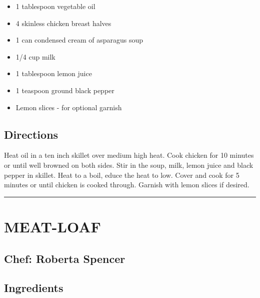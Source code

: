 \documentclass[
]{book}
\providecommand{\tightlist}{%
  \setlength{\itemsep}{0pt}\setlength{\parskip}{0pt}}
\begin{document}
\begin{itemize}
\tightlist
\item
  1 tablespoon vegetable oil
\item
  4 skinless chicken breast halves
\item
  1 can condensed cream of asparagus soup
\item
  1/4 cup milk
\item
  1 tablespoon lemon juice
\item
  1 teaspoon ground black pepper
\item
  Lemon slices - for optional garnish
\end{itemize}

\hypertarget{directions-60}{%
\subsection*{Directions}\label{directions-60}}


Heat oil in a ten inch skillet over medium high heat. Cook chicken for 10 minutes or until well browned
on both sides. Stir in the soup, milk, lemon juice and black pepper in skillet. Heat to a boil,
educe the heat to low. Cover and cook for 5 minutes or until chicken is cooked through. Garnish with lemon slices if desired.

\begin{center}\rule{0.5\linewidth}{0.5pt}\end{center}

\hypertarget{meat-loaf}{%
\section*{MEAT-LOAF}\label{meat-loaf}}


\hypertarget{chef-roberta-spencer-21}{%
\subsection*{Chef: Roberta Spencer}\label{chef-roberta-spencer-21}}


\hypertarget{ingredients-61}{%
\subsection*{Ingredients}\label{ingredients-61}}
\end{document}
